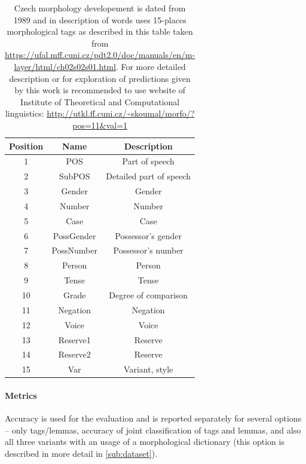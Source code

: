 \begin{table}[!ht]
\centering
\begin{tabular}{ |c|c|c| } 
 \hline
 Position & Name & Description \\ 
 \hline \hline
 1 & POS & Part of speech \\ \hline
 2 & SubPOS & Detailed part of speech \\ \hline
  3 & Gender & Gender \\ \hline
4 & Number & Number \\\hline
  5 & Case & Case \\ \hline
 6 & PossGender & Possessor's gender \\\hline
  7 & PossNumber & Possessor's number \\ \hline
8 & Person & Person \\\hline
  9 & Tense & Tense \\ \hline
 10 & Grade & Degree of comparison\\\hline
  11 & Negation & Negation \\ \hline
 12 & Voice & Voice \\\hline
 13 & Reserve1 & Reserve \\ \hline
14 & Reserve2 & Reserve \\\hline
  15 & Var & Variant, style \\ 
 \hline
\end{tabular}
\caption{Czech morphology developement is dated from 1989 \citep{Hajic2004} 
and in description of words uses 15-places morphological tags as described in this table taken from \url{https://ufal.mff.cuni.cz/pdt2.0/doc/manuals/en/m-layer/html/ch02s02s01.html}. For more detailed  description or for exploration of predictions given by this work is recommended to use website of Institute of Theoretical and Computational linguistics: \url{http://utkl.ff.cuni.cz/~skoumal/morfo/?pos=11\&val=1}}
\label{Tab:tagset}
\end{table}

\paragraph{Metrics} Accuracy is used for the evaluation and is reported separately for several options -- only tags/lemmas, accuracy of joint classification of tags and lemmas, and  also all three variants with an usage of a morphological dictionary (this option is described in more detail in \ref{sub:dataset}).

